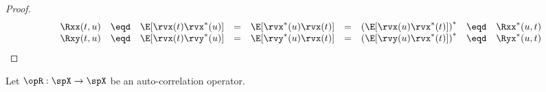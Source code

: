 \begin{proof}
\[\begin{array}{*{12}{l}}
   \Rxx(t,u)
      &\eqd& \E[\rvx(t) \rvx^\ast(u)]
      &=&      \E[\rvx^\ast(u) \rvx(t) ]
      &=&      \left( \E[\rvx(u) \rvx^\ast(t) ] \right)^\ast
      &\eqd& \Rxx^\ast(u,t)
\\
   \Rxy(t,u)
      &\eqd& \E[\rvx(t) \rvy^\ast(u)]
      &=&      \E[\rvy^\ast(u) \rvx(t) ]
      &=&      \left( \E[\rvy(u) \rvx^\ast(t) ] \right)^\ast
      &\eqd& \Ryx^\ast(u,t)
\end{array}\]
\end{proof}


\begin{theorem}
Let $\opR:\spX\to\spX$ be an auto-correlation operator.
\end{theorem}
